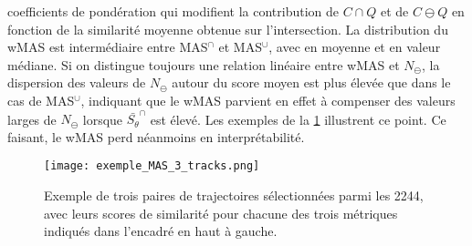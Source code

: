 \documentclass[../main.tex]{subfiles}
\begin{document}
coefficients de pondération qui modifient la contribution de $C \cap Q$ et de $C \ominus Q$ en fonction de la similarité moyenne obtenue sur l'intersection. La
distribution du wMAS est intermédiaire entre MAS$^\cap$ et MAS$^\cup$, avec  en moyenne et  en valeur médiane. Si on distingue toujours une
relation linéaire entre wMAS et $N_\ominus$, la dispersion des valeurs de $N_\ominus$ autour du score moyen est plus élevée que dans le cas de MAS$^\cup$,
indiquant que le wMAS parvient en effet à compenser des valeurs larges de $N_\ominus$ lorsque $\bar{S_\theta}^\cap$ est élevé. Les exemples de la
\cref{fig:exemple_MAS} illustrent ce point. Ce faisant, le wMAS perd néanmoins en interprétabilité.

\begin{figure}[htb]
    \centering
    \texttt{[image: exemple\_MAS\_3\_tracks.png]}
    \caption{Exemple de trois paires de trajectoires sélectionnées parmi les \num{2244}, avec leurs scores de similarité pour chacune des trois métriques
    indiqués dans l'encadré en haut à gauche.}
    \label{fig:exemple_MAS}
\end{figure}
\end{document}
